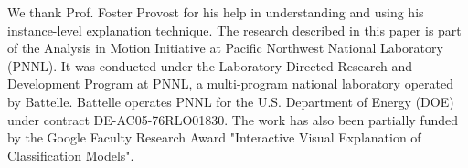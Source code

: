 






% 












We thank Prof. Foster Provost for his help in understanding and using his instance-level explanation technique. The research described in this paper is part of the Analysis in Motion Initiative at Pacific Northwest National Laboratory (PNNL). It was conducted under the Laboratory Directed Research and Development Program at PNNL, a multi-program national laboratory operated by Battelle. Battelle operates PNNL for the U.S. Department of Energy (DOE) under contract DE-AC05-76RLO01830. The work has also been partially funded by the Google Faculty Research Award "Interactive Visual Explanation of Classification Models".

% 
% 
%
%
%

% 
% 
